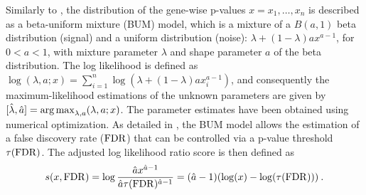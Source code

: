 Similarly to \parencite{pounds2003estimating}, the distribution of the gene-wise p-values $x = x_1, \ldots, x_n$ is described as a beta-uniform mixture (BUM) model, which is a mixture of a $B(a, 1)$ beta distribution (signal) and a uniform distribution (noise):   %
$\lambda + (1- \lambda)ax^{a-1}$, for $0 < a < 1$, with mixture parameter  $\lambda$ and shape parameter $a$ of the beta distribution.
The log likelihood is defined as $\log\left(\lambda, a;x\right) = \sum_{i=1}^{n}\log(\lambda+(1-\lambda)a x_i^{a-1})$, and consequently the maximum-likelihood estimations of the unknown parameters are given by $[\hat{\lambda}, \hat{a}] = \argmax_{\lambda,a} \left(\lambda,a;x\right)$.
The parameter estimates have been obtained using numerical
optimization. %
As detailed in \parencite{pounds2003estimating}, the BUM model allows the estimation of a false discovery rate ($\mathrm{FDR}$) that can be controlled via a p-value threshold $\tau(\mathrm{FDR})$.
The adjusted log likelihood ratio score is then defined as
\[
s(x, \FDR) =   \log\frac{\hat{a} x^{\hat{a}-1}}{\hat{a} \tau(\FDR)^{\hat{a}-1}}
= (\hat{a}-1)\left(\log(x) - \log(\tau(\FDR))\right)\:.
\label{eqn:scoreFDR}
\]

